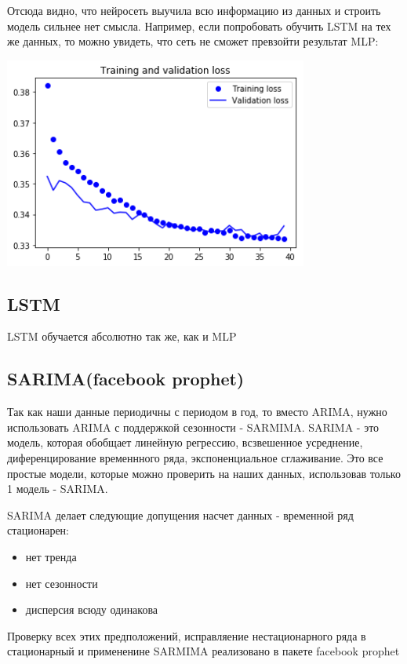 \documentclass[11pt]{article}
\begin{document}
Отсюда видно, что нейросеть выучила всю информацию из данных и строить модель сильнее нет смысла. Например, если
попробовать обучить LSTM на тех же данных, то можно увидеть, что сеть не сможет превзойти результат MLP:
\begin{center}
\includegraphics[width=10cm]{./pics/lstm_loss.png}
\end{center}
\subsection{LSTM}
\label{sec:org5f9df91}
LSTM обучается абсолютно так же, как и MLP
\subsection{SARIMA(facebook prophet)}
\label{sec:org7f44b10}
Так как наши данные периодичны с периодом в год, то вместо ARIMA, нужно использовать ARIMA с поддержкой сезонности -
SARMIMA. SARIMA - это модель, которая обобщает линейную регрессию, всзвешенное усреднение, диференцирование временнного
ряда, экспоненциальное сглаживание. Это все простые модели, которые можно проверить на наших данных, использовав только
1 модель - SARIMA.

SARIMA делает следующие допущения насчет данных - временной ряд стационарен:
\begin{itemize}
\item нет тренда
\item нет сезонности
\item дисперсия всюду одинакова
\end{itemize}

Проверку всех этих предположений, исправляение нестационарного ряда в стационарный и примененине SARMIMA реализовано в
пакете facebook prophet
\end{document}

